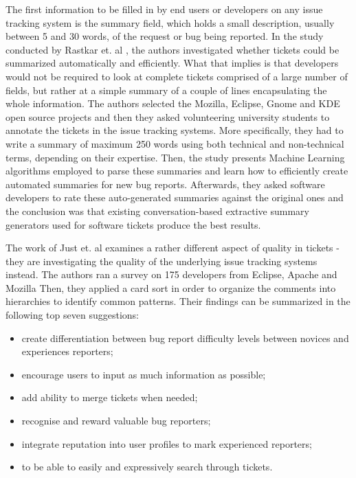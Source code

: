 \documentclass{mpaper}
\begin{document}
The first information to be filled in by end users or developers on any issue tracking system
is the summary field, which holds a small description, usually between 5 and 30 words, of 
the request or bug being reported. In the study conducted by Rastkar et. al \cite{rastkar2010summarizing}, 
the authors investigated whether tickets could be summarized automatically and efficiently. What 
that implies is that developers would not be required to look at complete tickets comprised 
of a large number of fields, but rather at a simple summary of a couple of lines 
encapsulating the whole information. The authors selected the Mozilla, Eclipse, Gnome and KDE 
open source projects and then they asked volunteering university students to annotate 
the tickets in the issue tracking systems. More specifically, they had to write a summary 
of maximum 250 words using both technical and non-technical terms, depending on their expertise. 
Then, the study presents Machine Learning algorithms employed to parse these summaries and 
learn how to efficiently create automated summaries for new bug reports. Afterwards, they asked 
software developers to rate these auto-generated summaries against the original ones and 
the conclusion was that existing conversation-based extractive summary generators used 
for software tickets produce the best results.

The work of Just et. al \cite{just2008towards} examines a rather different aspect
of quality in tickets - they are investigating the quality of the underlying issue 
tracking systems instead. 
The authors ran a survey on 175 developers from Eclipse, Apache and Mozilla
Then, they applied a card sort in order to organize the comments into hierarchies to 
identify common patterns. Their findings can be summarized in the following top seven
suggestions:
  \begin{itemize}
    \item create differentiation between bug report difficulty levels between 
    novices and experiences reporters;
    \item encourage users to input as much information as possible;
    \item add ability to merge tickets when needed;
    \item recognise and reward valuable bug reporters;
    \item integrate reputation into user profiles to mark experienced reporters;
    \item to be able to easily and expressively search through tickets.
  \end{itemize}
\end{document}

